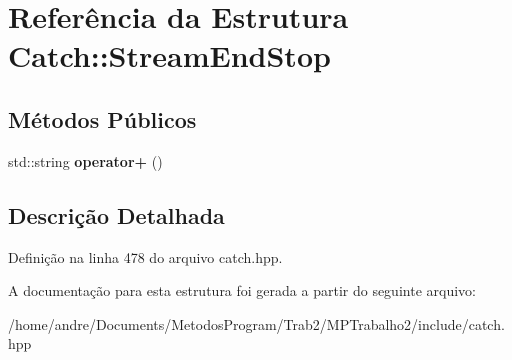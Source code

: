 \hypertarget{structCatch_1_1StreamEndStop}{}\section{Referência da Estrutura Catch\+:\+:Stream\+End\+Stop}
\label{structCatch_1_1StreamEndStop}
\subsection*{Métodos Públicos}
\begin{DoxyCompactItemize}
\item 
std\+::string {\bfseries operator+} ()\hypertarget{structCatch_1_1StreamEndStop_a3025092e06c224e0845f2caa07b26d0e}{}\label{structCatch_1_1StreamEndStop_a3025092e06c224e0845f2caa07b26d0e}

\end{DoxyCompactItemize}


\subsection{Descrição Detalhada}


Definição na linha 478 do arquivo catch.\+hpp.



A documentação para esta estrutura foi gerada a partir do seguinte arquivo\+:\begin{DoxyCompactItemize}
\item 
/home/andre/\+Documents/\+Metodos\+Program/\+Trab2/\+M\+P\+Trabalho2/include/catch.\+hpp\end{DoxyCompactItemize}
